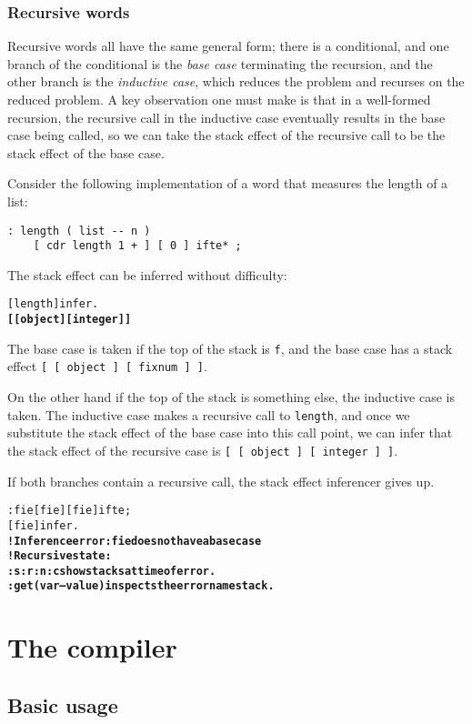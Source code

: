 \documentclass{book}
\begin{document}
\subsection{Recursive words}

Recursive words all have the same general form; there is a conditional, and one branch of the conditional is the \emph{base case} terminating the recursion, and the other branch is the \emph{inductive case}, which reduces the problem and recurses on the reduced problem. A key observation one must make is that in a well-formed recursion, the recursive call in the inductive case eventually results in the base case being called, so we can take the stack effect of the recursive call to be the stack effect of the base case.

Consider the following implementation of a word that measures the length of a list:
\begin{verbatim}
: length ( list -- n )
    [ cdr length 1 + ] [ 0 ] ifte* ;
\end{verbatim}
The stack effect can be inferred without difficulty:
\begin{alltt}
  [ length ] infer .
\textbf{[ [ object ] [ integer ] ]}
\end{alltt}
The base case is taken if the top of the stack is \verb|f|, and the base case has a stack effect \verb|[ [ object ] [ fixnum ] ]|.

On the other hand if the top of the stack is something else, the inductive case is taken. The inductive case makes a recursive call to \verb|length|, and once we substitute the stack effect of the base case into this call point, we can infer that the stack effect of the recursive case is \verb|[ [ object ] [ integer ] ]|.

If both branches contain a recursive call, the stack effect inferencer gives up.
\begin{alltt}
  : fie [ fie ] [ fie ] ifte ;
  [ fie ] infer .
\textbf{! Inference error: fie does not have a base case
! Recursive state:
:s :r :n :c show stacks at time of error.
:get ( var -- value ) inspects the error namestack.}
\end{alltt}

\chapter{The compiler}\label{compiler}

\section{Basic usage}
\end{document}
